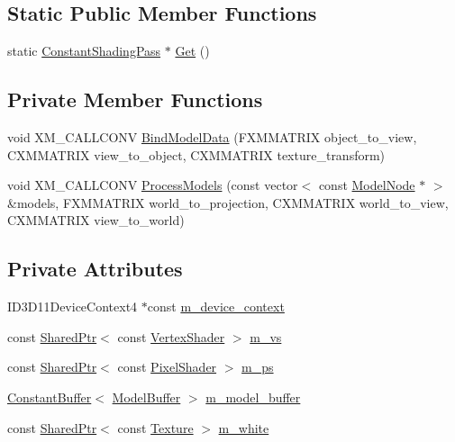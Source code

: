 \subsection*{Static Public Member Functions}
\begin{DoxyCompactItemize}
\item 
static \hyperlink{classmage_1_1_constant_shading_pass}{Constant\+Shading\+Pass} $\ast$ \hyperlink{classmage_1_1_constant_shading_pass_a135bc9dc8b4f2abf209c094980988364}{Get} ()
\end{DoxyCompactItemize}
\subsection*{Private Member Functions}
\begin{DoxyCompactItemize}
\item 
void X\+M\+\_\+\+C\+A\+L\+L\+C\+O\+NV \hyperlink{classmage_1_1_constant_shading_pass_a512f1c4284e475e94502530bd37367b4}{Bind\+Model\+Data} (F\+X\+M\+M\+A\+T\+R\+IX object\+\_\+to\+\_\+view, C\+X\+M\+M\+A\+T\+R\+IX view\+\_\+to\+\_\+object, C\+X\+M\+M\+A\+T\+R\+IX texture\+\_\+transform)
\item 
void X\+M\+\_\+\+C\+A\+L\+L\+C\+O\+NV \hyperlink{classmage_1_1_constant_shading_pass_a96157e32461e60e7f7c4e30a8c91e560}{Process\+Models} (const vector$<$ const \hyperlink{classmage_1_1_model_node}{Model\+Node} $\ast$ $>$ \&models, F\+X\+M\+M\+A\+T\+R\+IX world\+\_\+to\+\_\+projection, C\+X\+M\+M\+A\+T\+R\+IX world\+\_\+to\+\_\+view, C\+X\+M\+M\+A\+T\+R\+IX view\+\_\+to\+\_\+world)
\end{DoxyCompactItemize}
\subsection*{Private Attributes}
\begin{DoxyCompactItemize}
\item 
I\+D3\+D11\+Device\+Context4 $\ast$const \hyperlink{classmage_1_1_constant_shading_pass_a34769eb874a24f75c1d9ed8a6610eddc}{m\+\_\+device\+\_\+context}
\item 
const \hyperlink{namespacemage_a1e01ae66713838a7a67d30e44c67703e}{Shared\+Ptr}$<$ const \hyperlink{classmage_1_1_vertex_shader}{Vertex\+Shader} $>$ \hyperlink{classmage_1_1_constant_shading_pass_a2c03eec34054038e54b4837c4e23812c}{m\+\_\+vs}
\item 
const \hyperlink{namespacemage_a1e01ae66713838a7a67d30e44c67703e}{Shared\+Ptr}$<$ const \hyperlink{namespacemage_a27ecaf266420ee7a494d64edc0757129}{Pixel\+Shader} $>$ \hyperlink{classmage_1_1_constant_shading_pass_a719c0a1d8de1fe80ab79667f3daaa3b0}{m\+\_\+ps}
\item 
\hyperlink{structmage_1_1_constant_buffer}{Constant\+Buffer}$<$ \hyperlink{structmage_1_1_model_buffer}{Model\+Buffer} $>$ \hyperlink{classmage_1_1_constant_shading_pass_ae828b9ae1e4cd281f346aca0db34c015}{m\+\_\+model\+\_\+buffer}
\item 
const \hyperlink{namespacemage_a1e01ae66713838a7a67d30e44c67703e}{Shared\+Ptr}$<$ const \hyperlink{classmage_1_1_texture}{Texture} $>$ \hyperlink{classmage_1_1_constant_shading_pass_aa5c9222b0de16e351b90752150d584d1}{m\+\_\+white}
\end{DoxyCompactItemize}


